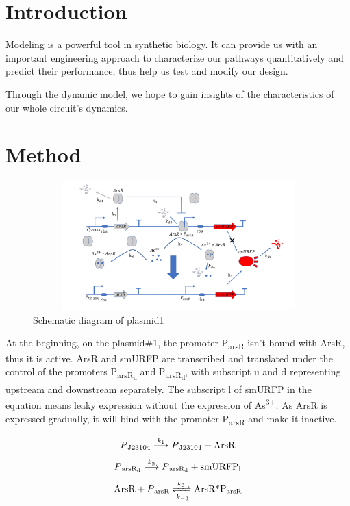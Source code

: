\section{Introduction}
Modeling is a powerful tool in synthetic biology. It can provide us with an important engineering approach to characterize our pathways quantitatively and predict their performance, thus help us test and modify our design.

Through the dynamic model, we hope to gain insights of the characteristics of our whole circuit's dynamics.

\section{Method}

\begin{figure}[h]
\centering
\includegraphics[width=12cm,height=5cm]{1}
\caption{Schematic diagram of plasmid1}
\end{figure}

At the beginning, on the plasmid\#1, the promoter P\textsubscript{arsR} isn't bound with ArsR, thus it is active. ArsR and smURFP are transcribed and translated under the control of the promoters P\textsubscript{arsR\textsubscript{u}} and P\textsubscript{arsR\textsubscript{d}}, with subscript u and d representing upstream and downstream separately. The subscript l of smURFP in the equation means leaky expression without the expression of As\textsuperscript{3+}. As ArsR is expressed gradually, it will bind with the promoter P\textsubscript{arsR} and make it inactive. \cite{pola2018novel}

\begin{equation}
P\textsubscript{J23104}\stackrel{k_1}{\longrightarrow} P\textsubscript{J23104}+\text{ArsR}
\end{equation}
\begin{equation}
P\textsubscript{arsR\textsubscript{d}} \stackrel{k_2}{\longrightarrow} P\textsubscript{arsR\textsubscript{d}} +\text{smURFP\textsubscript{l}}
\end{equation}
\begin{equation}
\text{ArsR}+P\textsubscript{arsR} \xrightleftharpoons[k_{-3}]{k_3}\text{ArsR*P\textsubscript{arsR}}
\end{equation} 

